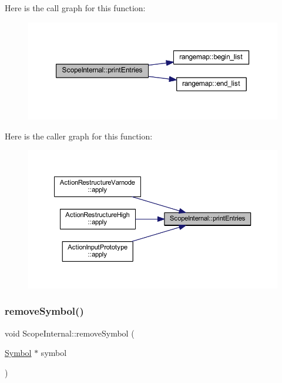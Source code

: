 Here is the call graph for this function\+:
\nopagebreak
\begin{figure}[H]
\begin{center}
\leavevmode
\includegraphics[width=350pt]{class_scope_internal_aac820e63b0d1739b9f14e15898fc9a9e_cgraph}
\end{center}
\end{figure}
Here is the caller graph for this function\+:
\nopagebreak
\begin{figure}[H]
\begin{center}
\leavevmode
\includegraphics[width=350pt]{class_scope_internal_aac820e63b0d1739b9f14e15898fc9a9e_icgraph}
\end{center}
\end{figure}
\mbox{\label{class_scope_internal_a77c1ceb048a903b047c1e52108890979}} 
\subsubsection{\texorpdfstring{removeSymbol()}{removeSymbol()}}
{\footnotesize\ttfamily void Scope\+Internal\+::remove\+Symbol (\begin{DoxyParamCaption}\item[{\mbox{\hyperlink{class_symbol}{Symbol}} $\ast$}]{symbol }\end{DoxyParamCaption})\hspace{0.3cm}{\ttfamily [virtual]}}



